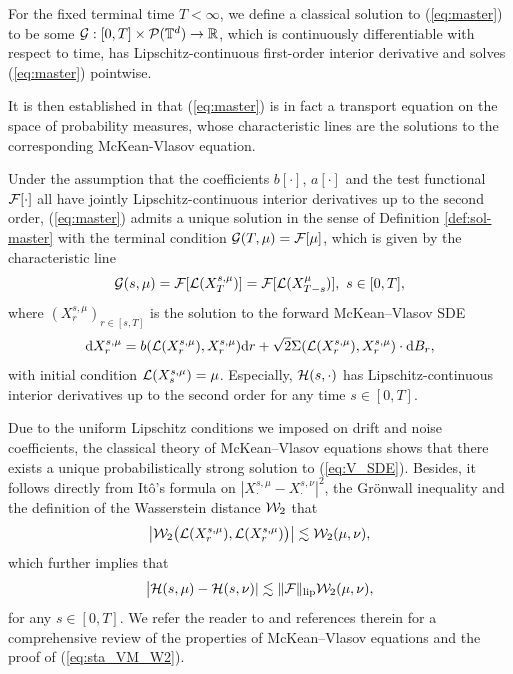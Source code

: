 \begin{defi}\label{def:sol-master}
For the fixed terminal time $T < \infty$, we define a classical solution to (\ref{eq:master}) to be some $\mathcal{G}: [0,T] \times \mathcal{P}(\mathbb{T}^d) \to \mathbb{R}$, which is continuously differentiable with respect to time, has Lipschitz-continuous first-order interior derivative and solves (\ref{eq:master}) pointwise.
\end{defi}

It is then established in \cite{BLPC17} that (\ref{eq:master}) is in fact a transport equation on the space of probability measures, whose characteristic lines are the solutions to the corresponding McKean-Vlasov equation.

\begin{prop}\label{prop:sol_kolmogorov} Under the assumption that the coefficients $b[\cdot]$, $a[\cdot]$ and the test functional $\mathcal{F}[\cdot]$ all have jointly Lipschitz-continuous interior derivatives up to the second order, (\ref{eq:master}) admits a unique solution in the sense of Definition \ref{def:sol-master} with the terminal condition $\mathcal{G}(T,\mu) = \mathcal{F}[\mu]$, which is given by the characteristic line
\begin{equation}
\mathcal{G}(s,\mu) = \mathcal{F}[\mathcal{L}(X_T^{s,\mu})] = \mathcal{F}[\mathcal{L}(X_{T-s}^{\mu})], \ s \in [0,T],
\end{equation}
where $(X_r^{s,\mu})_{r \in [s,T]}$ is the solution to the forward McKean–Vlasov SDE 
\begin{equation}\label{eq:V_SDE}
\mathrm{d}X_r^{s,\mu} = b(\mathcal{L}(X_r^{s,\mu}),X_r^{s,\mu})\mathrm{d}r + \sqrt{2}\Sigma(\mathcal{L}(X_r^{s,\mu}),X_r^{s,\mu}) \cdot \mathrm{d}B_r,
\end{equation}
with initial condition $\mathcal{L}(X_s^{s,\mu}) = \mu$. Especially, $\mathcal{H}(s,\cdot)$ has Lipschitz-continuous interior derivatives up to the second order for any time $s \in [0,T]$.
\end{prop}

Due to the uniform Lipschitz conditions we imposed on drift and noise coefficients, the classical theory of McKean–Vlasov equations shows that there exists a unique probabilistically strong solution to (\ref{eq:V_SDE}). Besides, it follows directly from It\^o's formula on $|X_{\cdot}^{s, \mu} - X_{\cdot}^{s, \nu}|^2$, the Grönwall inequality and the definition of the Wasserstein distance $\mathcal{W}_2$ that
\begin{equation}\label{eq:sta_VM_W2}
\big|\mathcal{W}_2\big(\mathcal{L}(X_r^{s, \mu}), \mathcal{L}(X_r^{s, \mu})\big)\big| \lesssim  \mathcal{W}_2(\mu,\nu),
\end{equation}
which further implies that 
\begin{equation}\label{eq:lip_G_0}
\big|\mathcal{H}(s,\mu) - \mathcal{H}(s,\nu)| \lesssim \|\mathcal{F}\|_{\operatorname{lip}} \mathcal{W}_2(\mu,\nu),
\end{equation}
for any $s \in [0,T]$. We refer the reader to \cite{CM18,HRW21} and references therein for a comprehensive review of the properties of McKean–Vlasov equations and the proof of (\ref{eq:sta_VM_W2}). 

